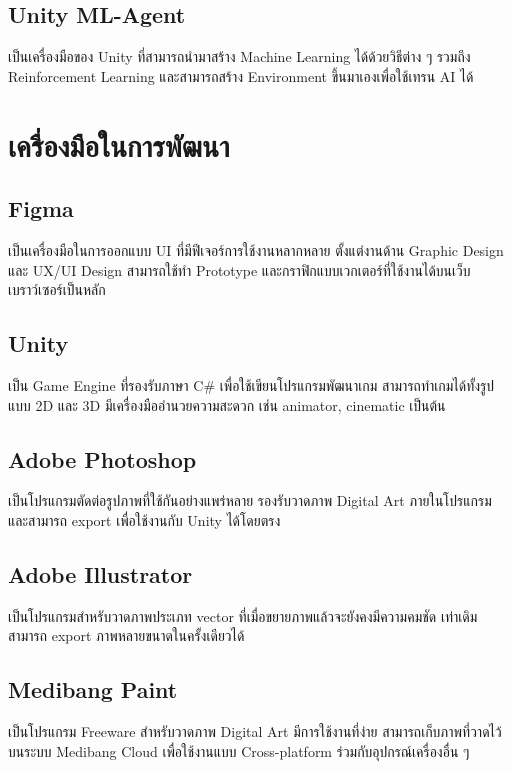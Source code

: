 \documentclass[12pt,oneside,openright,a4paper]{cpe-thai-project}
\begin{document}
\subsection{Unity ML-Agent}
เป็นเครื่องมือของ Unity ที่สามารถนำมาสร้าง Machine Learning 
ได้ด้วยวิธีต่าง ๆ รวมถึง Reinforcement Learning และสามารถสร้าง 
Environment ขึ้นมาเองเพื่อใช้เทรน AI ได้


\section{เครื่องมือในการพัฒนา}

\subsection{Figma}
เป็นเครื่องมือในการออกแบบ UI ที่มีฟีเจอร์การใช้งานหลากหลาย 
ตั้งแต่งานด้าน Graphic Design และ UX/UI Design สามารถใช้ทำ 
Prototype และกราฟิกแบบเวกเตอร์ที่ใช้งานได้บนเว็บเบราว์เซอร์เป็นหลัก 

\subsection{Unity}
เป็น Game Engine ที่รองรับภาษา C\# เพื่อใช้เขียนโปรแกรมพัฒนาเกม  
สามารถทำเกมได้ทั้งรูปแบบ 2D และ 3D มีเครื่องมืออำนวยความสะดวก 
เช่น animator, cinematic เป็นต้น

\subsection{Adobe Photoshop}
เป็นโปรแกรมตัดต่อรูปภาพที่ใช้กันอย่างแพร่หลาย รองรับวาดภาพ Digital Art 
ภายในโปรแกรม และสามารถ export เพื่อใช้งานกับ Unity ได้โดยตรง
 
\subsection{Adobe Illustrator}
	เป็นโปรแกรมสำหรับวาดภาพประเภท vector ที่เมื่อขยายภาพแล้วจะยังคงมีความคมชัด
  เท่าเดิม สามารถ export ภาพหลายขนาดในครั้งเดียวได้
 
\subsection{Medibang Paint} 
เป็นโปรแกรม Freeware สำหรับวาดภาพ Digital Art มีการใช้งานที่ง่าย 
สามารถเก็บภาพที่วาดไว้บนระบบ Medibang Cloud เพื่อใช้งานแบบ Cross-platform 
ร่วมกับอุปกรณ์เครื่องอื่น ๆ


\pagebreak
\end{document}
